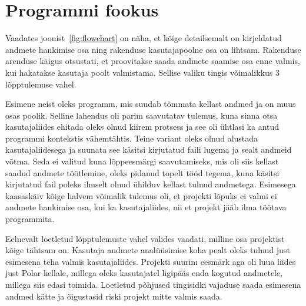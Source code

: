 \section{Programmi fookus}\label{sec:arenduskaik}
Vaadates joonist~\ref{fig:flowchart} on näha, et kõige detailsemalt on kirjeldatud andmete hankimise osa ning rakenduse kasutajapoolne osa on lihtsam.
Rakenduse arenduse käigus otsustati, et proovitakse saada andmete saamise osa enne valmis, kui hakatakse kasutaja poolt valmistama.
Sellise valiku tingis võimalikkus 3 lõpptulemuse vahel.

Esimene neist oleks programm, mis suudab tõmmata kellast andmed ja on muus osas poolik.
Selline lahendus oli parim saavutatav tulemus, kuna sinna otsa kasutajaliides ehitada oleks olnud kiirem protsess ja see oli ühtlasi ka antud programmi kontekstis vähemtähtis.
Teine variant oleks olnud alustada kasutajaliidesega ja suunata see käsitsi kirjutatud faili lugema ja sealt andmeid võtma. 
Seda ei valitud kuna lõppeesmärgi saavutamiseks, mis oli siis kellast saadud andmete töötlemine, oleks pidanud topelt tööd tegema, kuna käsitsi kirjutatud fail poleks ilmselt olnud ühilduv kellast tulnud andmetega.  
Esimesega kaasaskäiv kõige halvem võimalik tulemus oli, et projekti lõpuks ei valmi ei andmete hankimise osa, kui ka kasutajaliides, nii et projekt jääb ilma töötava programmita.

Eelnevalt loetletud lõpptulemuste vahel valides vaadati, milline osa projektist kõige tähtsam on.
Kasutaja andmete analüüsimise koha pealt oleks tulnud just esimesena teha valmis kasutajaliides.
Projekti suurim eesmärk aga oli luua liides just Polar kellale, millega oleks kasutajatel ligipääs enda kogutud andmetele, millega siis edasi toimida.
Loetletud põhjused tingisidki vajaduse saada esimesena andmed kätte ja õigustasid riski projekt mitte valmis saada.